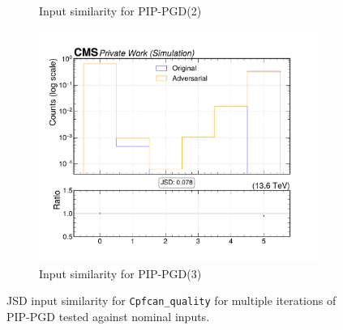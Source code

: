 \begin{figure}[htbp]
\begin{subfigure}[t]{0.32\textwidth}
    \caption*{Input similarity for PIP-PGD(2)}
  \end{subfigure}\hfill
  \begin{subfigure}[t]{0.32\textwidth}
    \includegraphics[width=\linewidth]{media/output/features/compare/combined_it_3/cmp_cpf_arr_Cpfcan_quality.pdf}
    \caption*{Input similarity for PIP-PGD(3)}
  \end{subfigure}

  \caption*{JSD input similarity for \texttt{Cpfcan\_quality} for multiple iterations of PIP-PGD tested against nominal inputs.}
  \label{fig:combined_input_Cpfcan_quality}
\end{figure}


